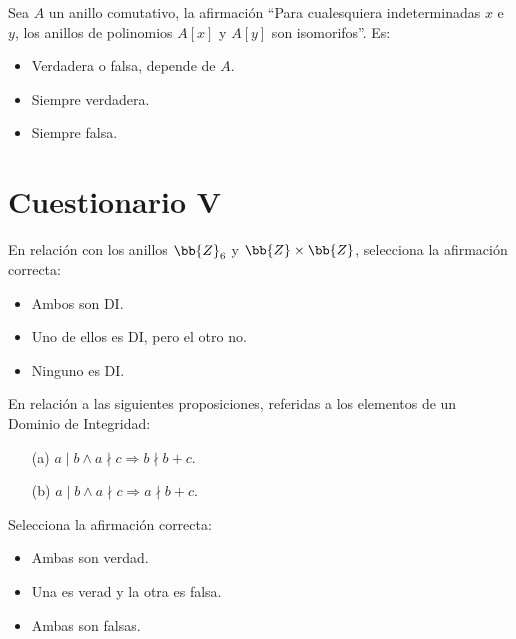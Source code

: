 \documentclass[12pt]{article}
\newcounter{ejercicio}[section] %
\newcounter{ejercicio}
\newcommand{\resetearcontador}{%
  \setcounter{ejercicio}{0} %
}
\begin{document}
    \begin{ejercicio}
        Sea $A$ un anillo comutativo, la afirmación ``Para cualesquiera indeterminadas $x$ e $y$, los anillos de polinomios $A[x]$ y $A[y]$ son isomorifos''. Es:
        \begin{itemize}
            \item Verdadera o falsa, depende de $A$.
            \item Siempre verdadera.
            \item Siempre falsa.
        \end{itemize}
    \end{ejercicio}

    \newpage
    \resetearcontador
    \section{Cuestionario V}

    \begin{ejercicio}
        En relación con los anillos $\bb{Z}_6$ y $\bb{Z} \times \bb{Z}$, selecciona la afirmación correcta:
        \begin{itemize}
            \item Ambos son DI.
            \item Uno de ellos es DI, pero el otro no.
            \item Ninguno es DI.
        \end{itemize}
    \end{ejercicio}

    \begin{ejercicio}
        En relación a las siguientes proposiciones, referidas a los elementos de un Dominio de Integridad:
        \begin{enumerate}
            \item [(a)] $a\mid b \land a \nmid c \Rightarrow b \nmid b+c$.
            \item [(b)] $a\mid b \land a \nmid c \Rightarrow a \nmid b+c$.
        \end{enumerate}
        Selecciona la afirmación correcta:
        \begin{itemize}
            \item Ambas son verdad.
            \item Una es verad y la otra es falsa.
            \item Ambas son falsas.
        \end{itemize}
    \end{ejercicio}
\end{document}
